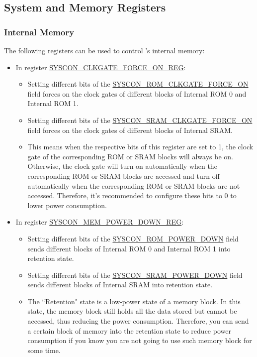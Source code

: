 \documentclass[main\_\_EN.tex]{subfiles}
\begin{document}
\subsection{System and Memory Registers}

\subsubsection{Internal Memory}

The following registers can be used to control \chipname{}'s internal memory:

\begin{itemize}
\item In register \hyperref[regdescSYSCONCLKGATEFORCEONREG]{SYSCON\_CLKGATE\_FORCE\_ON\_REG}:
    \begin{itemize}
        \item Setting different bits of the \hyperref[fielddescSYSCONROMCLKGATEFORCEON]{SYSCON\_ROM\_CLKGATE\_FORCE\_ON} field forces on the clock gates of different blocks of Internal ROM 0 and Internal ROM 1.
        \item Setting different bits of the \hyperref[fielddescSYSCONSRAMCLKGATEFORCEON]{SYSCON\_SRAM\_CLKGATE\_FORCE\_ON} field forces on the clock gates of different blocks of Internal SRAM.
        \item This means when the respective bits of this register are set to 1, the clock gate of the corresponding ROM or SRAM blocks will always be on. Otherwise, the clock gate will turn on automatically when the corresponding ROM or SRAM blocks are accessed and turn off automatically when the corresponding ROM or SRAM blocks are not accessed. Therefore, it's recommended to configure these bits to 0 to lower power consumption.
    \end{itemize}
    \item In register \hyperref[regdescSYSCONMEMPOWERDOWNREG]{SYSCON\_MEM\_POWER\_DOWN\_REG}:
    \begin{itemize}
        \item Setting different bits of the \hyperref[fielddescSYSCONROMPOWERDOWN]{SYSCON\_ROM\_POWER\_DOWN} field sends different blocks of Internal ROM 0 and Internal ROM 1 into retention state.
        \item Setting different bits of the \hyperref[fielddescSYSCONSRAMPOWERDOWN]{SYSCON\_SRAM\_POWER\_DOWN} field sends different blocks of Internal SRAM into retention state.
        \item The ``Retention" state is a low-power state of a memory block. In this state, the memory block still holds all the data stored but cannot be accessed, thus reducing the power consumption. Therefore, you can send a certain block of memory into the retention state to reduce power consumption if you know you are not going to use such memory block for some time.

\end{itemize}
\end{itemize}
\end{document}
